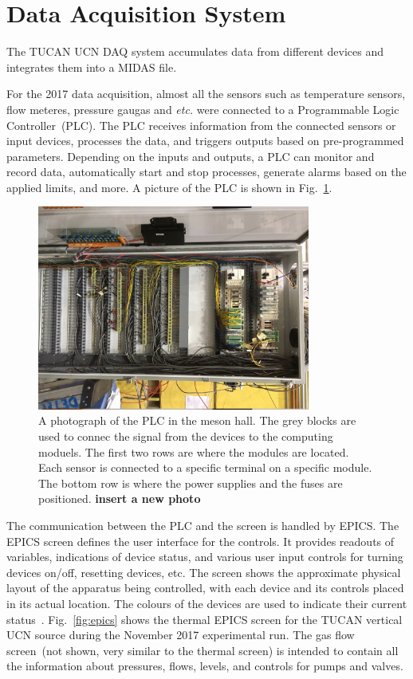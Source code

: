 \section{Data Acquisition System\label{sec:DAQ}}
The TUCAN UCN DAQ system accumulates data from different devices and
integrates them into a MIDAS file.

For the 2017 data acquisition, almost all the sensors such as
temperature sensors, flow meteres, pressure gaugas and {\it{etc.}}
were connected to a Programmable Logic Controller~(PLC).  The PLC
receives information from the connected sensors or input devices,
processes the data, and triggers outputs based on pre-programmed
parameters.  Depending on the inputs and outputs, a PLC can monitor
and record data, automatically start and stop processes, generate
alarms based on the applied limits, and more. A picture of the PLC is
shown in Fig.~\ref{fig:PLC}.

\begin{figure}[h!]
  \centering
  \includegraphics[width=0.8\textwidth, angle = 90]{PLC.JPG}
  \caption{A photograph of the PLC in the meson hall. The grey blocks
    are used to connec the signal from the devices to the computing
    moduels. The first two rows are where the modules are
    located. Each sensor is connected to a specific terminal on a
    specific module. The bottom row is where the power supplies and the
    fuses are positioned. {\bf{insert a new photo}} }
  \label{fig:PLC}
\end{figure}
The communication between the PLC and the screen is handled by EPICS.
The EPICS screen defines the user interface for the controls. It
provides readouts of variables, indications of device status, and
various user input controls for turning devices on/off, resetting
devices, etc. The screen shows the approximate physical layout of the
apparatus being controlled, with each device and its controls placed
in its actual location. The colours of the devices are used to
indicate their current status~\cite{Sean_manual}. Fig.~\ref{fig:epics}
shows the thermal EPICS screen for the TUCAN vertical UCN source
during the November 2017 experimental run. The gas flow screen~(not
shown, very similar to the thermal screen) is intended to contain all
the information about pressures, flows, levels, and controls for pumps and
valves.

